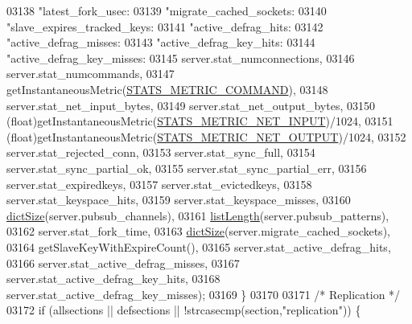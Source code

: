 \begin{DoxyCode}
{{{{{{{{{{{{{{{{{{{{{{{{{{{{{{{{{{{{{{{{{{{{{{{{{{{{{{{{{{{{{{{{{{{{{{{{{{{{{{{{{{{{{{{{{{{{{{{{{{{{{{{{{{{{{{{{{{{{{{{{{{{{{{{{{{{03138             \textcolor{stringliteral}{"latest\_fork\_usec:%
03139             \textcolor{stringliteral}{"migrate\_cached\_sockets:%
03140             \textcolor{stringliteral}{"slave\_expires\_tracked\_keys:%
03141             \textcolor{stringliteral}{"active\_defrag\_hits:%
03142             \textcolor{stringliteral}{"active\_defrag\_misses:%
03143             \textcolor{stringliteral}{"active\_defrag\_key\_hits:%
03144             \textcolor{stringliteral}{"active\_defrag\_key\_misses:%
03145             server.stat\_numconnections,
03146             server.stat\_numcommands,
03147             getInstantaneousMetric(\hyperlink{server_8h_ac8d50898802f96b76479bc975e1bbbf3}{STATS\_METRIC\_COMMAND}),
03148             server.stat\_net\_input\_bytes,
03149             server.stat\_net\_output\_bytes,
03150             (\textcolor{keywordtype}{float})getInstantaneousMetric(\hyperlink{server_8h_a6d217560ae714ab8d0cc21832b210e0b}{STATS\_METRIC\_NET\_INPUT})/1024,
03151             (\textcolor{keywordtype}{float})getInstantaneousMetric(\hyperlink{server_8h_a3885f356f3a4cef22eb96fbfcc406333}{STATS\_METRIC\_NET\_OUTPUT})/1024,
03152             server.stat\_rejected\_conn,
03153             server.stat\_sync\_full,
03154             server.stat\_sync\_partial\_ok,
03155             server.stat\_sync\_partial\_err,
03156             server.stat\_expiredkeys,
03157             server.stat\_evictedkeys,
03158             server.stat\_keyspace\_hits,
03159             server.stat\_keyspace\_misses,
03160             \hyperlink{dict_8h_af193430dd3d5579a52b194512f72c1f0}{dictSize}(server.pubsub\_channels),
03161             \hyperlink{adlist_8h_afde0ab079f934670e82119b43120e94b}{listLength}(server.pubsub\_patterns),
03162             server.stat\_fork\_time,
03163             \hyperlink{dict_8h_af193430dd3d5579a52b194512f72c1f0}{dictSize}(server.migrate\_cached\_sockets),
03164             getSlaveKeyWithExpireCount(),
03165             server.stat\_active\_defrag\_hits,
03166             server.stat\_active\_defrag\_misses,
03167             server.stat\_active\_defrag\_key\_hits,
03168             server.stat\_active\_defrag\_key\_misses);
03169     \}
03170 
03171     \textcolor{comment}{/* Replication */}
03172     \textcolor{keywordflow}{if} (allsections || defsections || !strcasecmp(section,\textcolor{stringliteral}{"replication"})) \{
}}}}}}}}}}}}}}}}}}}}}}}}}}}}}}}}}}}}}}}}}}}}}}}}}}}}}}}}}}}}}}}}}}}}}}}}}}}}}}}}}}}}}}}}}}}}}}}}}}}}}}}}}}}}}}}}}}}}}}}}}}}}}}}}}}}}}}}}}}
\end{DoxyCode}
